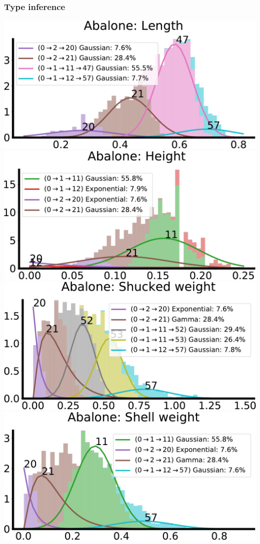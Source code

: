 \documentclass[xcolor={usenames,dvipsnames,svgnames}, compress, aspectratio=169, 11pt]{beamer}
\begin{document}
\begin{frame}[t, htt=bgrey2]
  \frametitle{Type inference}

  \large
  \begin{minipage}[t]{0.9\linewidth}
    \vspace{0pt}
    \includegraphics[width=0.4\columnwidth]{figures/d1-fit-crop.pdf}\hspace{10pt}
    \includegraphics[width=0.4\columnwidth]{figures/d3-fit-crop.pdf}\\[15pt]
    \includegraphics[width=0.4\columnwidth]{figures/d5-fit-crop.pdf}\hspace{12pt}
    \includegraphics[width=0.4\columnwidth]{figures/d7-fit-crop.pdf}
  \end{minipage}\hfill\begin{minipage}[t]{0.3\linewidth}
    \vspace{-150pt}
    
  \end{minipage}\hfill\begin{minipage}[t]{0.3\linewidth}
    \vspace{-150pt}
    
  \end{minipage}
  
\end{frame}
\end{document}
